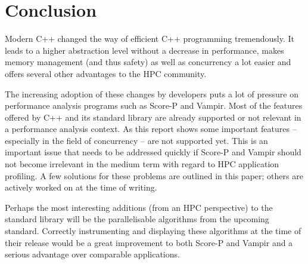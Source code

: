 \section{Conclusion}

Modern C++ changed the way of efficient C++ programming tremendously. It leads to a higher abstraction level without a decrease in performance, makes memory management (and thus safety) as well as concurrency a lot easier and offers several other advantages to the HPC community.

The increasing adoption of these changes by developers puts a lot of pressure on performance analysis programs such as Score-P and Vampir. Most of the features offered by C++ and its standard library are already supported or not relevant in a performance analysis context. As this report shows some important features -- especially in the field of concurrency -- are not supported yet. This is an important issue that needs to be addressed quickly if Score-P and Vampir should not become irrelevant in the medium term with regard to HPC application profiling. A few solutions for these problems are outlined in this paper; others are actively worked on at the time of writing.

Perhaps the most interesting additions (from an HPC perspective) to the standard library will be the parallelisable algorithms from the upcoming standard. Correctly instrumenting and displaying these algorithms at the time of their release would be a great improvement to both Score-P and Vampir and a serious advantage over comparable applications.